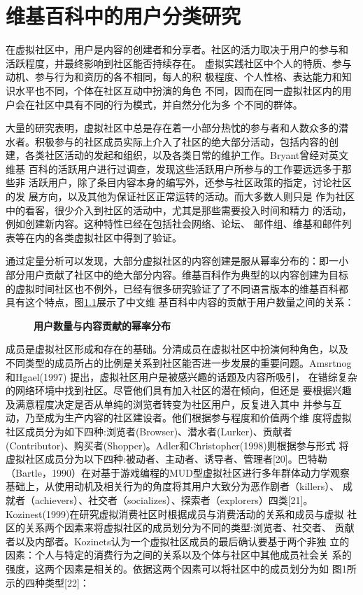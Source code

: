 
\chapter{维基百科中的用户分类研究}
\label{cha:user-category}

在虚拟社区中，用户是内容的创建者和分享者。社区的活力取决于用户的参与和
活跃程度，并最终影响到社区能否持续存在。
虚拟实践社区中个人的特质、参与动机、参与行为和资历的各不相同，每人的积
极程度、个人性格、表达能力和知识水平也不同，个体在社区互动中扮演的角色
不同，因而在同一虚拟社区内的用户会在社区中具有不同的行为模式，并自然分化为多
个不同的群体。

大量的研究表明，虚拟社区中总是存在着一小部分热忱的参与者和人数众多的潜
水者。积极参与的社区成员实际上介入了社区的绝大部分活动，包括内容的创
建，各类社区活动的发起和组织，以及各类日常的维护工作。Bryant曾经对英文维基
百科的活跃用户进行过调查，发现这些活跃用户所参与的工作要远远多于那些非
活跃用户，除了条目内容本身的编写外，还参与社区政策的指定，讨论社区的发
展方向，以及其他为保证社区正常运转的活动\cite{1099205}。而大多数人则只是
作为社区中的看客，很少介入到社区的活动中，尤其是那些需要投入时间和精力
的活动，例如创建新内容。这种特性已经在包括社会网络、论坛、
邮件组、维基和邮件列表等在内的各类虚拟社区中得到了验证。

通过定量分析可以发现，大部分虚拟社区的内容创建是服从幂率分布的：即一小
部分用户贡献了社区中的绝大部分内容。维基百科作为典型的以内容创建为目标
的虚拟时间社区也不例外，已经有很多研究验证了了不同语言版本的维基百科都
具有这个特点，图\ref{fig:power-law}展示了中文维
基百科中内容的贡献于用户数量之间的关系：

\begin{figure}
  \centering
 \scalebox{0.4}{ \texttt{[image: 02-3]}}
  \caption{\small{\bf{用户数量与内容贡献的幂率分布}}}
  \label{fig:power-law}
\end{figure}

成员是虚拟社区形成和存在的基础。分清成员在虚拟社区中扮演何种角色，以及
不同类型的成员所占的比例是关系到社区能否进一步发展的重要问题。Amsrtnog和Hgael(1997) 提出，虚拟社区用户是被感兴趣的话题及内容所吸引，
在错综复杂的网络环境中找到社区。尽管他们具有加入社区的潜在倾向，但还是
要根据兴趣及满意程度决定是否从单纯的浏览者转变为社区用户，反复进入其中
并参与互动，乃至成为生产内容的社区建设者。他们根据参与程度和价值两个维
度将虚拟社区成员分为如下四种:浏览者(Browser)、潜水者(Lurker)、贡献者
(Contributor)、购买者(Shopper)。Adler和Christopher(1998)则根据参与形式
将虚拟社区成员分为以下四种:被动者、主动者、诱导者、管理者[20]。巴特勒
（Bartle，1990）在对基于游戏编程的MUD型虚拟社区进行多年群体动力学观察
基础上，从使用动机及相关行为的角度将其用户大致分为恶作剧者（killers）、
成就者（achievers）、社交者（socializes）、探索者（explorers）四类[21]。
Kozinest(1999)在研究虚拟消费社区时根据成员与消费活动的关系和成员与虚拟
社区的关系两个因素来将虚拟社区的成员划分为不同的类型:浏览者、社交者、
贡献者以及内部者。Kozinets认为一个虚拟社区成员的最后确认要基于两个非独
立的因素：个人与特定的消费行为之间的关系以及个体与社区中其他成员社会关
系的强度，这两个因素是相关的。依据这两个因素可以将社区中的成员划分为如
图1所示的四种类型[22]：

